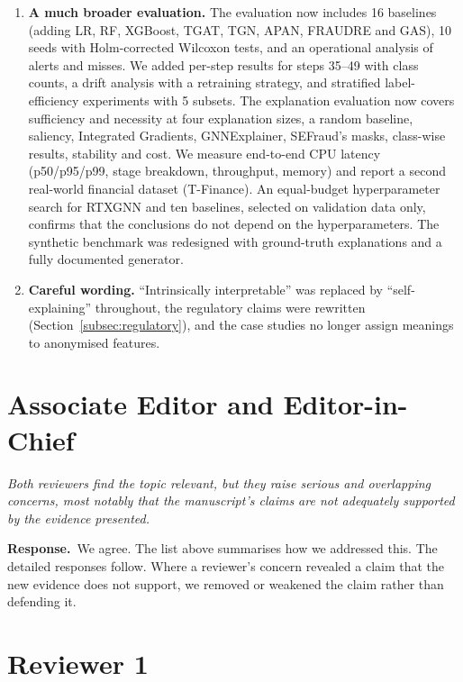 \documentclass[11pt]{article}
\newenvironment{comment}{\par\medskip\noindent\begin{minipage}{\linewidth}\itshape\color{black!75}}{\end{minipage}\par\smallskip}
\newcommand{\resp}{\par\noindent\textbf{Response.}\ }
\begin{document}
\begin{enumerate}[leftmargin=*]
\item \textbf{A much broader evaluation.} The evaluation now includes 16 baselines (adding LR, RF, XGBoost, TGAT, TGN, APAN, FRAUDRE and GAS), 10 seeds with Holm-corrected Wilcoxon tests, and an operational analysis of alerts and misses. We added per-step results for steps 35--49 with class counts, a drift analysis with a retraining strategy, and stratified label-efficiency experiments with 5 subsets. The explanation evaluation now covers sufficiency and necessity at four explanation sizes, a random baseline, saliency, Integrated Gradients, GNNExplainer, SEFraud's masks, class-wise results, stability and cost. We measure end-to-end CPU latency (p50/p95/p99, stage breakdown, throughput, memory) and report a second real-world financial dataset (T-Finance). An equal-budget hyperparameter search for RTXGNN and ten baselines, selected on validation data only, confirms that the conclusions do not depend on the hyperparameters. The synthetic benchmark was redesigned with ground-truth explanations and a fully documented generator.
\item \textbf{Careful wording.} ``Intrinsically interpretable'' was replaced by ``self-explaining'' throughout, the regulatory claims were rewritten (Section~\ref{subsec:regulatory}), and the case studies no longer assign meanings to anonymised features.
\end{enumerate}

\section*{Associate Editor and Editor-in-Chief}

\begin{comment}
Both reviewers find the topic relevant, but they raise serious and overlapping concerns, most notably that the manuscript's claims are not adequately supported by the evidence presented.
\end{comment}
\resp We agree. The list above summarises how we addressed this. The detailed responses follow. Where a reviewer's concern revealed a claim that the new evidence does not support, we removed or weakened the claim rather than defending it.

\section*{Reviewer 1}
\end{document}
